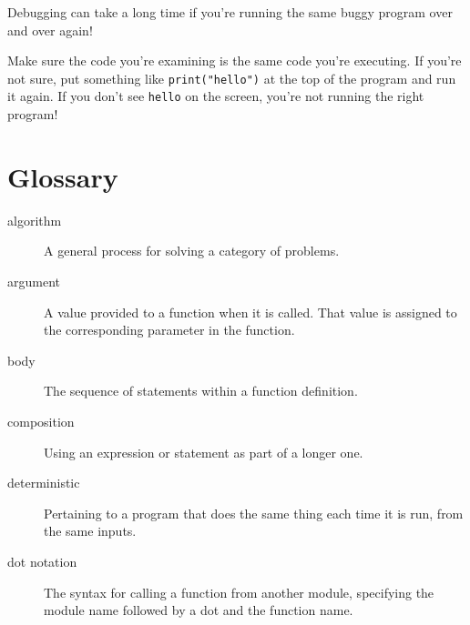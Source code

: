 Debugging can take a long time if you're running the same buggy program over and over again!

Make sure the code you're examining is the same code you're executing. If you're not sure, put something like \texttt{print("hello")} at the top of the program and run it again. If you don't see \texttt{hello} on the screen, you're not running the right program!

\hypertarget{glosario}{%
\section{Glossary}\label{glosario}}

\begin{description}
\item[algorithm]
A general process for solving a category of problems.
\end{description}

\begin{description}
\item[argument]
A value provided to a function when it is called. That value is assigned to the corresponding parameter in the function.
\end{description}

\begin{description}
\item[body]
The sequence of statements within a function definition.
\end{description}

\begin{description}
\item[composition]
Using an expression or statement as part of a longer one.
\end{description}

\begin{description}
\item[deterministic]
Pertaining to a program that does the same thing each time it is run, from the same inputs.
\end{description}

\begin{description}
\item[dot notation]
The syntax for calling a function from another module, specifying the module name followed by a dot and the function name.
\end{description}

